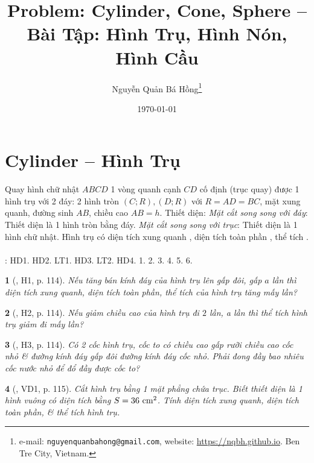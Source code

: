 \documentclass{article}
\title{Problem: Cylinder, Cone, Sphere -- Bài Tập: Hình Trụ, Hình Nón, Hình Cầu}
\author{Nguyễn Quản Bá Hồng\footnote{e-mail: \texttt{nguyenquanbahong@gmail.com}, website: \url{https://nqbh.github.io}. Ben Tre City, Vietnam.}}
\date{\today}
\newtheorem{baitoan}{}
\begin{document}
\maketitle
\tableofcontents


\section{Cylinder -- Hình Trụ}
 Quay hình chữ nhật $ABCD$ 1 vòng quanh cạnh $CD$ cố định (trục quay) được 1 hình trụ với 2 đáy: 2 hình tròn $(C;R),(D;R)$ với $R = AD = BC$, mặt xung quanh, đường sinh $AB$, chiều cao $AB = h$.  {\sf Thiết diện}: \textit{Mặt cắt song song với đáy}: Thiết diện là 1 hình tròn bằng đáy. \textit{Mặt cắt song song với trục}: Thiết diện là 1 hình chữ nhật.  Hình trụ có diện tích xung quanh , diện tích toàn phần , thể tích .\\
\\
\cite[Chap. X, \S1, pp. 92--97]{SGK_Toan_9_Canh_Dieu_tap_1}: HD1. HD2. LT1. HD3. LT2. HD4. 1. 2. 3. 4. 5. 6.

\begin{baitoan}[\cite{Binh_boi_duong_Toan_9_tap_2}, H1, p. 114]
	Nếu tăng bán kính đáy của hình trụ lên gấp đôi, gấp $a$ lần thì diện tích xung quanh, diện tích toàn phần, thể tích của hình trụ tăng mấy lần?
\end{baitoan}

\begin{baitoan}[\cite{Binh_boi_duong_Toan_9_tap_2}, H2, p. 114]
	Nếu giảm chiều cao của hình trụ đi $2$ lần, a lần thì thể tích hình trụ giảm đi mấy lần?
\end{baitoan}

\begin{baitoan}[\cite{Binh_boi_duong_Toan_9_tap_2}, H3, p. 114]
	Có 2 cốc hình trụ, cốc to có chiều cao gấp rưỡi chiều cao cốc nhỏ \& đường kính đáy gấp đôi đường kính đáy cốc nhỏ. Phải đong đầy bao nhiêu cốc nước nhỏ để đổ đầy được cốc to?
\end{baitoan}

\begin{baitoan}[\cite{Binh_boi_duong_Toan_9_tap_2}, VD1, p. 115]
	Cắt hình trụ bằng 1 mặt phẳng chứa trục. Biết thiết diện là 1 hình vuông có diện tích bằng $S = 36\ {\rm cm}^2$. Tính diện tích xung quanh, diện tích toàn phần, \& thể tích hình trụ.
\end{baitoan}
\end{document}
